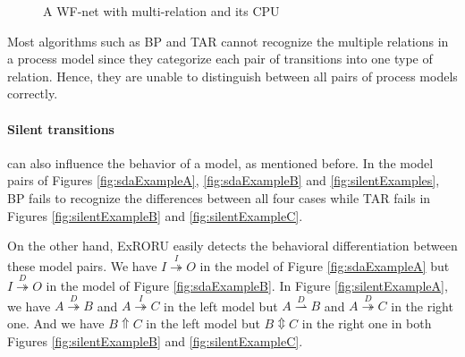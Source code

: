 \documentclass{llncs}
\begin{document}
\begin{figure}[htbp]
\centering
{}
\caption{A WF-net with multi-relation and its CPU\label{fig:exampleMultiRelation}}
\end{figure}

Most algorithms such as BP and TAR cannot recognize the multiple relations in a process model since they categorize each pair of transitions into one type of relation. Hence, they are unable to distinguish between all pairs of process models correctly.

\paragraph{\textbf{Silent transitions}} can also influence the behavior of a model, as mentioned before. In the model pairs of Figures \ref{fig:sdaExampleA}, \ref{fig:sdaExampleB} and \ref{fig:silentExamples}, BP fails to recognize the differences between all four cases while TAR fails in Figures \ref{fig:silentExampleB} and \ref{fig:silentExampleC}. 

On the other hand, ExRORU easily detects the behavioral differentiation between these model pairs. We have $I\overset{I}{\twoheadrightarrow}O$ in the model of Figure \ref{fig:sdaExampleA} but $I\overset{D}{\twoheadrightarrow}O$ in the model of Figure \ref{fig:sdaExampleB}. In Figure \ref{fig:silentExampleA}, we have $A\overset{D}{\twoheadrightarrow}B$ and $A\overset{I}{\twoheadrightarrow}C$ in the left model but $A\overset{D}{\rightharpoonup}B$ and $A\overset{D}{\twoheadrightarrow}C$ in the right one. And we have $B\Uparrow C$ in the left model but $B\Updownarrow C$ in the right one in both Figures \ref{fig:silentExampleB} and \ref{fig:silentExampleC}.
\end{document}
